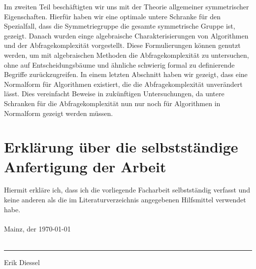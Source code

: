 \documentclass[10pt,a4paper, footheight=1mm]{scrreprt}
\theoremstyle{definition}
\begin{document}
Im zweiten Teil beschäftigten wir uns mit der
Theorie allgemeiner symmetrischer Eigenschaften.
Hierfür haben wir eine optimale untere Schranke für
den Spezialfall, dass die Symmetriegruppe die gesamte
symmetrische Gruppe ist, gezeigt. Danach wurden
einge algebraische Charakterisierungen von Algorithmen
und der Abfragekomplexität vorgestellt. Diese Formulierungen
können genutzt werden, um mit algebraischen Methoden
die Abfragekomplexität zu untersuchen, ohne auf 
Entscheidungsbäume und ähnliche schwierig formal zu 
definierende Begriffe zurückzugreifen. In einem letzten
Abschnitt haben wir gezeigt, dass eine Normalform
für Algorithmen existiert, die die Abfragekomplexität
unverändert lässt. Dies vereinfacht Beweise
in zukünftigen Untersuchungen, da untere Schranken
für die Abfragekomplexität nun nur noch für Algorithmen
in Normalform gezeigt werden müssen.

\printbibliography[title={\ Literatur}]

\chapter*{Erklärung über die selbstständige Anfertigung der Arbeit}

Hiermit erkläre ich, dass ich die vorliegende Facharbeit
selbstständig verfasst und keine anderen als die im Literaturverzeichnis
angegebenen Hilfsmittel verwendet habe. \\ \\

Mainz, der \today \\ \\

\rule{7cm}{0.4mm}
\vspace*{0.2cm}

Erik Diessel
\end{document}
